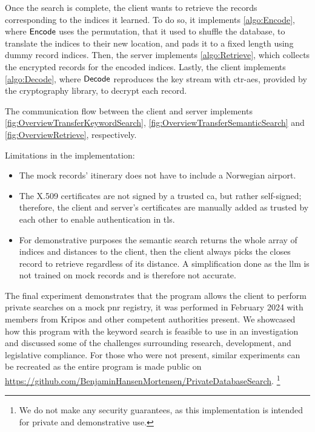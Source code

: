 Once the search is complete, the client wants to retrieve the records corresponding to the indices it learned. To do so, it implements \cref{algo:Encode}, where $ \mathsf{{Encode}} $ uses the permutation, that it used to shuffle the database, to translate the indices to their new location, and pads it to a fixed length using dummy record indices. Then, the server implements \cref{algo:Retrieve}, which collects the encrypted records for the encoded indices. Lastly, the client implements \cref{algo:Decode}, where $ \mathsf{{Decode}} $ reproduces the key stream with \acrshort{ctr}-\acrshort{aes}, provided by the cryptography library, to decrypt each record.

The communication flow between the client and server implements \cref{fig:OverviewTransferKeywordSearch}, \cref{fig:OverviewTransferSemanticSearch} and \cref{fig:OverviewRetrieve}, respectively.

\hfill

\noindent
Limitations in the implementation:
\begin{itemize}
    \item The mock records' itinerary does not have to include a Norwegian airport.
    \item The X.509 certificates are not signed by a trusted \acrfull{ca}, but rather self-signed; therefore, the client and server's certificates are manually added as trusted by each other to enable authentication in \acrshort{tls}.
    \item For demonstrative purposes the semantic search returns the whole array of indices and distances to the client, then the client always picks the closes record to retrieve regardless of its distance. A simplification done as the \acrshort{llm} is not trained on mock records and is therefore not accurate.
\end{itemize}

The final experiment demonstrates that the program allows the client to perform private searches on a mock \acrshort{pnr} registry, it was performed in February 2024 with members from Kripos and other competent authorities present. We showcased how this program with the keyword search is feasible to use in an investigation and discussed some of the challenges surrounding research, development, and legislative compliance. For those who were not present, similar experiments can be recreated as the entire program is made public on \url{https://github.com/BenjaminHansenMortensen/PrivateDatabaseSearch}. \footnote{We do not make any security guarantees, as this implementation is intended for private and demonstrative use.}
